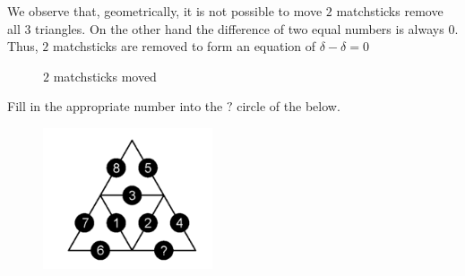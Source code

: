 \documentclass{article}
\begin{document}
\begin{figure}[h]
    \centering
    \caption{}
    \label{fig:pi-2022-3-p6}
\end{figure}

\begin{soln} 

    We observe that, geometrically, it is not possible to move $2$ matchsticks remove all $3$ triangles.
    On the other hand the difference of two equal numbers is always $0$.
    Thus, $2$ matchsticks are removed to form an equation of $\delta - \delta = 0$
 
    \begin{figure}[h]
        \centering
        \caption{$2$ matchsticks moved}
        \label{fig:pi-2022-3-p6-2}
    \end{figure}

\end{soln}

\begin{exercise*}[Exercise 1]
    \label{example:pi-2022-3-e1}
    Fill in the appropriate number into the $?$ circle of the  below.
\end{exercise*}

\begin{figure}[h]
    \centering
    \includegraphics[width=5cm]{./png/pi-2022-3-e1.png}
    \caption{}
    \label{fig:pi-2022-3-e1}
\end{figure}
\end{document}

